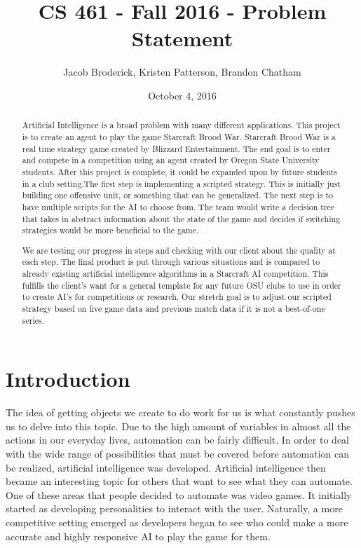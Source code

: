 \documentclass[10pt,letterpaper,onecolumn,draftclsnofoot]{IEEEtran}
\begin{document}
\begin{titlepage}
  \title{CS 461 - Fall 2016 - Problem Statement}
  \author{Jacob Broderick, Kristen Patterson, Brandon Chatham}
  \date{October 4, 2016}
  \maketitle
  \vspace{4cm}
  \begin{abstract}
  	\noindent 
  	Artificial Intelligence is a broad problem with many different applications. This project is to create an agent to play the game Starcraft Brood War. Starcraft Brood War is a real time strategy game created by Blizzard Entertainment. The end goal is to enter and compete in a competition using an agent created by Oregon State University students. After this project is complete, it could be expanded upon by future students in a club setting.The first step is implementing a scripted strategy. This is initially just building one offensive unit, or something that can be generalized. The next step is to have multiple scripts for the AI to choose from. The team would write a decision tree that takes in abstract information about the state of the game and decides if switching strategies would be more beneficial to the game.
  	
  	We are testing our progress in steps and checking with our client about the quality at each step. The final product is put through various situations and is compared to already existing artificial intelligence algorithms in a Starcraft AI competition. This fulfills the client's want for a general template for any future OSU clubs to use in order to create AI's for competitions or research. Our stretch goal is to adjust our scripted strategy based on live game data and previous match data if it is not a best-of-one series. 
  \end{abstract}
\end{titlepage}
\section{Introduction}
The idea of getting objects we create to do work for us is what constantly pushes us to delve into this topic. Due to the high amount of variables in almost all the actions in our everyday lives, automation can be fairly difficult. In order to deal with the wide range of possibilities that must be covered before automation can be realized, artificial intelligence was developed. Artificial intelligence then became an interesting topic for others that want to see what they can automate. One of these areas that people decided to automate was video games. It initially started as developing personalities to interact with the user. Naturally, a more competitive setting emerged as developers began to see who could make a more accurate and highly responsive AI to play the game for them.
\end{document}
